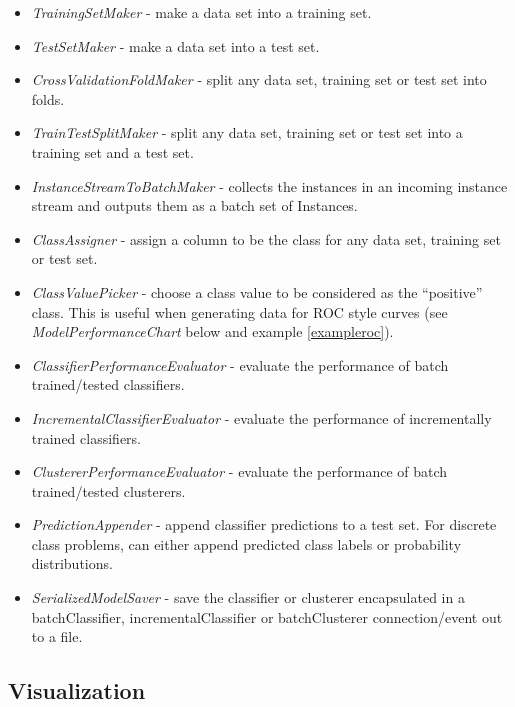 \begin{itemize}
	\item \textit{TrainingSetMaker} - make a data set into a training set.
	\item \textit{TestSetMaker} - make a data set into a test set.
	\item \textit{CrossValidationFoldMaker} - split any data set, training 
	set or test set into folds.
	\item \textit{TrainTestSplitMaker} - split any data set, training set 
	or test set into a training set and a test set.
        \item \textit{InstanceStreamToBatchMaker} - collects the instances in
          an incoming instance stream and outputs them as a batch set of Instances.
	\item \textit{ClassAssigner} - assign a column to be the class for any 
	data set, training set or test set.
	\item \textit{ClassValuePicker} - choose a class value to be considered 
	as the ``positive'' class. This is useful when generating data for ROC style 
	curves (see \textit{ModelPerformanceChart} below and example \ref{exampleroc}).
	\item \textit{ClassifierPerformanceEvaluator} - evaluate the performance of 
	batch trained/tested classifiers.
	\item \textit{IncrementalClassifierEvaluator} - evaluate the performance of 
	incrementally trained classifiers.
	\item \textit{ClustererPerformanceEvaluator} - evaluate the performance of 
	batch trained/tested clusterers.
	\item \textit{PredictionAppender} - append classifier predictions to a test 
	set. For discrete class problems, can either append predicted class labels or
	probability distributions.
        \item \textit{SerializedModelSaver} - save the classifier or clusterer
          encapsulated in a batchClassifier, incrementalClassifier or batchClusterer
          connection/event out to a file.
\end{itemize}

\newpage
\subsection{Visualization}

